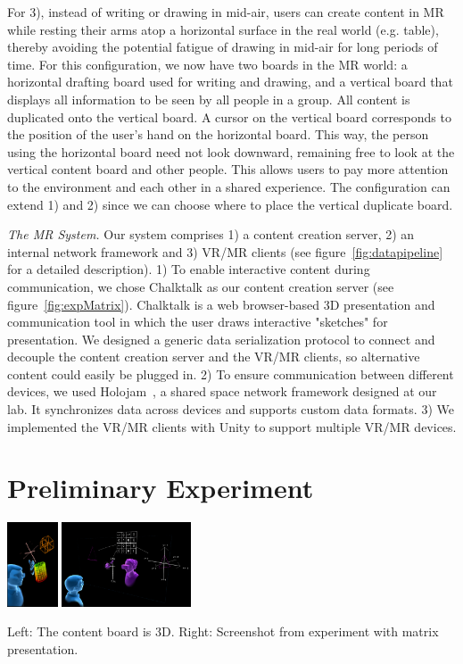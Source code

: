\documentclass[sigchi-a]{acmart}
\begin{document}
For 3), instead of writing or drawing in mid-air, users can create content in MR
while resting their arms atop a horizontal surface in the real world (e.g. table), thereby avoiding the potential fatigue of drawing in mid-air for long periods of time. For this configuration, we now have two boards in the MR world: a horizontal drafting board used for writing and drawing, and a vertical board that displays all information to be seen by all people in a group. All content is duplicated onto the vertical board. A cursor on the vertical board corresponds to the position of the user's hand on the horizontal board. This way, the person using the horizontal board need not look downward, remaining free to look at the vertical content board and other people. This allows users to pay more attention to the environment and each other in a shared experience. The configuration can extend 1) and 2) since we can choose where to place the vertical duplicate board.

\textit{The MR System.} Our system comprises 1) a content creation server, 2) an internal network framework and 3) VR/MR clients (see figure~\ref{fig:datapipeline} for a detailed description). 1) To enable interactive content during communication, we chose Chalktalk as our content creation server (see figure~\ref{fig:expMatrix}). Chalktalk is a web browser-based 3D presentation and communication tool
in which the user draws interactive "sketches" for presentation. We designed a generic data serialization protocol to connect and decouple the content creation server and the VR/MR clients, so alternative content could easily be plugged in.
2) To ensure communication between different devices, we used Holojam~\cite{perlin2016future}, a shared space network framework designed at our lab.
It synchronizes data across devices and supports custom data formats.
3) We implemented the VR/MR clients with Unity to support multiple VR/MR devices.


\section{Preliminary Experiment}

\begin{marginfigure}
    \includegraphics[height = 2.5cm]{3d.png}
    \includegraphics[height = 2.5cm]{experimentMatrix.png}
    \caption{Left: The content board is 3D. Right: Screenshot from experiment with matrix presentation.}
    \label{fig:expMatrix}
\end{marginfigure}
\end{document}

